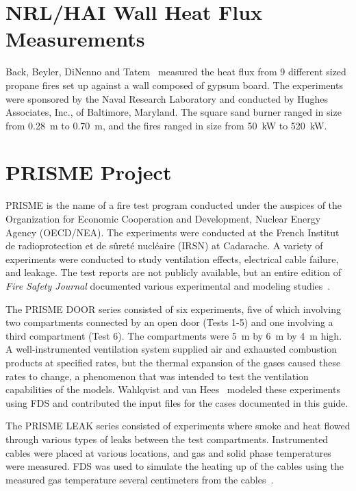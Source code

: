 \section{NRL/HAI Wall Heat Flux Measurements}

Back, Beyler, DiNenno and Tatem~\cite{Back:IAFSS4} measured the heat flux from 9 different sized propane fires set up against a wall composed
of gypsum board. The experiments were sponsored by the Naval Research Laboratory and conducted by Hughes Associates, Inc., of Baltimore, Maryland. The
square sand burner ranged in size from 0.28~m to 0.70~m, and the fires ranged in size from 50~kW to 520~kW.

\section{PRISME Project}

PRISME is the name of a fire test program conducted under the auspices of the Organization for Economic Cooperation and Development, Nuclear Energy Agency (OECD/NEA). The experiments were conducted at the French Institut de radioprotection et de s\^{u}ret\'{e} nucl\'{e}aire (IRSN) at Cadarache. A variety of experiments were conducted to study ventilation effects, electrical cable failure, and leakage. The test reports are not publicly available, but an entire edition of {\em Fire Safety Journal} documented various experimental and modeling studies~\cite{Audouin:FSJ}.

The PRISME DOOR series consisted of six experiments, five of which involving two compartments connected by an open door (Tests 1-5) and one involving a third compartment (Test 6). The compartments were 5~m by 6~m by 4~m high. A well-instrumented ventilation system supplied air and exhausted combustion products at specified rates, but the thermal expansion of the gases caused these rates to change, a phenomenon that was intended to test the ventilation capabilities of the models. Wahlqvist and van Hees~\cite{Wahlqvist:FSJ} modeled these experiments using FDS and contributed the input files for the cases documented in this guide.

The PRISME LEAK series consisted of experiments where smoke and heat flowed through various types of leaks between the test compartments. Instrumented cables were placed at various locations, and gas and solid phase temperatures were measured. FDS was used to simulate the heating up of the cables using the measured gas temperature several centimeters from the cables~\cite{Dreisbach:Interflam}.


